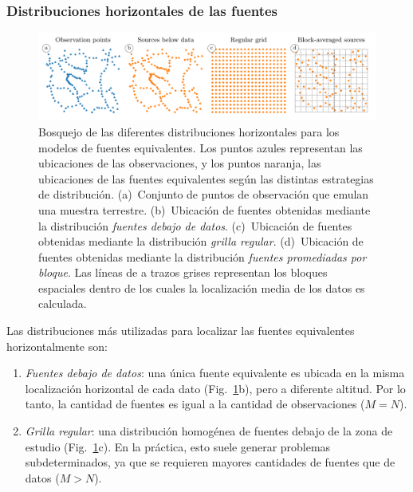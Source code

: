 \subsubsection{Distribuciones horizontales de las fuentes}

\begin{figure}[tb]
    \includegraphics[width=\linewidth]{figs/eql-gradient-boosted/source-layouts-schematics.pdf}
    \caption{
        Bosquejo de las diferentes distribuciones horizontales para los modelos
        de fuentes equivalentes.
        Los puntos azules representan las ubicaciones de las observaciones,
        y los puntos naranja, las ubicaciones de las fuentes equivalentes según
        las distintas estrategias de distribución.
        (a)~Conjunto de \SourceLayoutsSchematicsObservations{} puntos de
        observación que emulan una muestra terrestre.
        (b)~Ubicación de \SourceLayoutsSchematicsSourceBelowData{} fuentes
        obtenidas mediante la distribución \emph{fuentes debajo de datos}.
        (c)~Ubicación de \SourceLayoutsSchematicsGridSources{} fuentes
        obtenidas mediante la distribución \emph{grilla regular}.
        (d)~Ubicación de \SourceLayoutsSchematicsBlockAveragedSources{} fuentes
        obtenidas mediante la distribución \emph{fuentes promediadas por bloque}.
        Las líneas de a trazos grises representan los bloques espaciales dentro
        de los cuales la localización media de los datos es calculada.
    }
    \label{fig:source_layouts}
\end{figure}

Las distribuciones más utilizadas para localizar las fuentes equivalentes
horizontalmente son:

\begin{enumerate}
  \item
    \emph{Fuentes debajo de datos}: una única fuente equivalente es ubicada en
    la misma localización horizontal de cada dato
    (Fig.~\ref{fig:source_layouts}b), pero a diferente altitud. Por lo tanto,
    la cantidad de fuentes es igual a la cantidad de observaciones ($M=N$).
  \item
    \emph{Grilla regular}: una distribución homogénea de fuentes debajo de la
    zona de estudio (Fig.~\ref{fig:source_layouts}c). En la práctica, esto
    suele generar problemas subdeterminados, ya que se requieren mayores
    cantidades de fuentes que de datos ($M>N$).
\end{enumerate}

